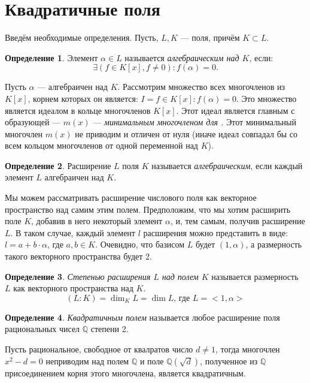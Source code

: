 \documentclass[a4paper,12pt]{scrartcl}
\theoremstyle{definition}
\newtheorem{definition}{Определение}
\begin{document}
\section{Квадратичные поля}

Введём необходимые определения. Пусть, $L, K$ — поля, причём $K \subset L$.

\begin{definition}
  Элемент $\alpha \in L$ называется 
  \emph{алгебраическим над $K$}, если:
  $$
  \exists (f \in K[x], f \ne 0) \colon f(\alpha)=0.
  $$
\end{definition}

Пусть $\alpha$ --- алгебраичен над $K$. Рассмотрим множество всех многочленов из
$K[x]$, корнем которых он является: $I = {f \in K[x]: f(\alpha)=0}$. Это
множество является идеалом в кольце многочленов $K[x]$. Этот идеал является
главным с образующей --- $m(x)$ --- 
\emph{минимальным многочленом для \alpha.} Этот минимальный многочлен $m(x)$ не
приводим и отличен от нуля (иначе идеал совпадал бы со всем кольцом многочленов
от одной переменной над $K$).

\begin{definition}
  Расширение $L$ поля $K$ называется  \emph{алгебраическим}, если каждый элемент $L$ алгебраичен
  над $K$.
\end{definition}

Мы можем рассматривать расширение числового поля как векторное пространство над
самим этим полем. Предположим, что мы хотим расширить поле $K$, добавив в него
некоторый элемент $\alpha$, и, тем самым, получив расширение $L$. В таком
случае, каждый элемент $l$ расширения можно представить в виде: $l = a + b \cdot
\alpha \text{, где } a,b \in K$. Очевидно, что базисом $L$ будет $(1, \alpha)$,
а размерность такого векторного пространства будет 2.

\begin{definition}
   \emph{Степенью расширения $L$ над
    полем $K$} называется размерность $L$ как векторного пространства над $K$.
  $$
  (L\colon K)=\dim_KL=\dim L \text{, где } L = <1,\alpha>
  $$
\end{definition}

\begin{definition}
   \emph{Квадратичным полем} называется любое
  расширение поля рациональных чисел $\mathbb{Q}$ степени 2.
\end{definition}
Пусть рациональное, свободное от квалратов число $d \ne 1$, тогда  многочлен $x^2-d=0$
неприводим над полем $\mathbb{Q}$ и поле $\mathbb{Q}(\sqrt{d})$, полученное из
$\mathbb{Q}$ присоединением корня этого многочлена, является квадратичным.




\printindex
\end{document}
